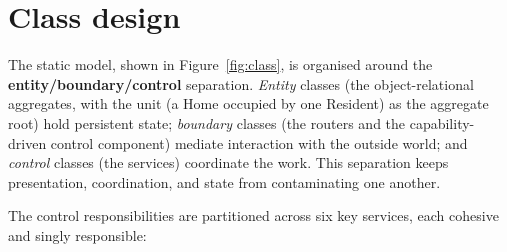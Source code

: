 \section{Class design}
\label{sec:classes}

The static model, shown in Figure~\ref{fig:class}, is organised around the
\textbf{entity/boundary/control} separation. \emph{Entity} classes
(the object-relational aggregates, with the unit (a Home occupied by one Resident) as the aggregate root) hold
persistent state; \emph{boundary} classes (the routers and the capability-driven
control component) mediate interaction with the outside world; and \emph{control}
classes (the services) coordinate the work. This separation keeps presentation,
coordination, and state from contaminating one another.


The control responsibilities are partitioned across six key services, each cohesive
and singly responsible:

